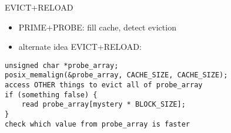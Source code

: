 \begin{frame}[fragile]{EVICT+RELOAD}
    \begin{itemize}
    \item PRIME+PROBE: fill cache, detect eviction
    \item alternate idea EVICT+RELOAD:
    \end{itemize}
\begin{Verbatim}[fontsize=\small]
unsigned char *probe_array;
posix_memalign(&probe_array, CACHE_SIZE, CACHE_SIZE);
access OTHER things to evict all of probe_array
if (something false) {
    read probe_array[mystery * BLOCK_SIZE];
}
check which value from probe_array is faster
\end{Verbatim}
\end{frame}
